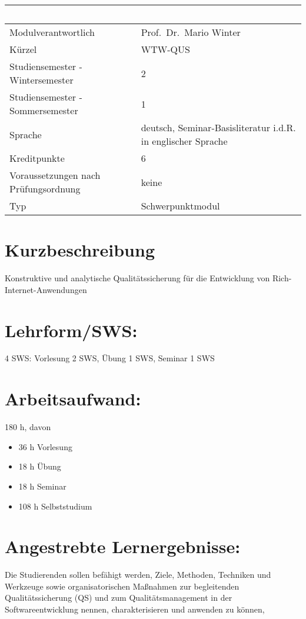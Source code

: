\begin{longtable}[]{@{}ll@{}}
\toprule
~ & ~\tabularnewline
\midrule
\endhead
Modulverantwortlich & Prof.~Dr.~Mario Winter\tabularnewline
Kürzel & WTW-QUS\tabularnewline
Studiensemester - Wintersemester & 2\tabularnewline
Studiensemester - Sommersemester & 1\tabularnewline
Sprache & deutsch, Seminar-Basisliteratur i.d.R. in englischer
Sprache\tabularnewline
Kreditpunkte & 6\tabularnewline
Voraussetzungen nach Prüfungsordnung & keine\tabularnewline
Typ & Schwerpunktmodul\tabularnewline
\bottomrule
\end{longtable}

\section*{Kurzbeschreibung}\label{kurzbeschreibung-11}

Konstruktive und analytische Qualitätssicherung für die Entwicklung von
Rich-Internet-Anwendungen

\section*{Lehrform/SWS:}\label{lehrformsws-21}

4 SWS: Vorlesung 2 SWS, Übung 1 SWS, Seminar 1 SWS

\section*{Arbeitsaufwand:}\label{arbeitsaufwand-27}

180 h, davon

\begin{itemize}
\item
  36 h Vorlesung
\item
  18 h Übung
\item
  18 h Seminar
\item
  108 h Selbststudium
\end{itemize}

\section*{Angestrebte
Lernergebnisse:}\label{angestrebte-lernergebnisse-21}

Die Studierenden sollen befähigt werden, Ziele, Methoden, Techniken und
Werkzeuge sowie organisatorischen Maßnahmen zur begleitenden
Qualitätssicherung (QS) und zum Qualitätsmanagement in der
Softwareentwicklung nennen, charakterisieren und anwenden zu können,

